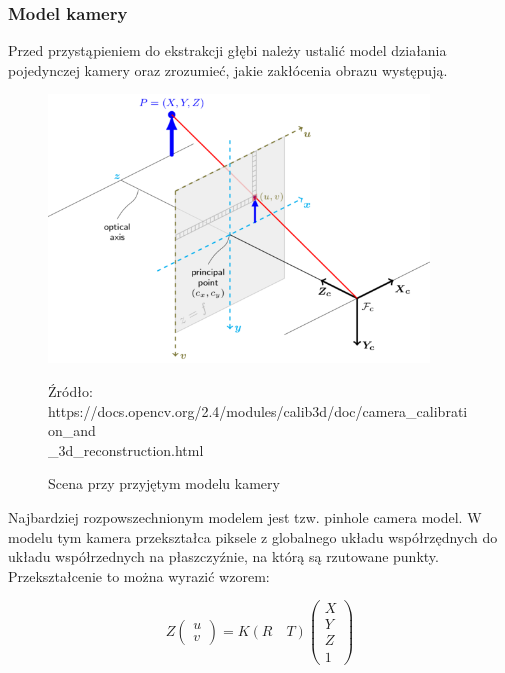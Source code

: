 \documentclass[oneside, eng]{mgr}
\begin{document}
\subsubsection{Model kamery}
Przed przystąpieniem do ekstrakcji głębi należy ustalić model działania pojedynczej kamery oraz zrozumieć, jakie zakłócenia obrazu występują.

\begin{figure}
\centering
	\includegraphics[width=0.90\textwidth]{pinhole_camera_model.png}\par\vspace{1cm}
\caption{Scena przy przyjętym modelu kamery}
Źródło: https://docs.opencv.org/2.4/modules/calib3d/doc/camera\_calibration\_and\\\_3d\_reconstruction.html
	\label{fig:camera_model}
\end{figure}

Najbardziej rozpowszechnionym modelem jest tzw. pinhole camera model. W modelu tym kamera przekształca piksele z globalnego układu współrzędnych do układu współrzednych na płaszczyźnie, na którą są rzutowane punkty. Przekształcenie to można wyrazić wzorem:

\begin{equation}
	Z
	\left( \begin{array}{l}
		u \\
		v 
	\end{array} \right) 
	= K (R \quad T) 
	\left( \begin{array}{l}
		X \\	Y \\	Z \\	1
	\end{array} \right) 
\end{equation}
\end{document}
